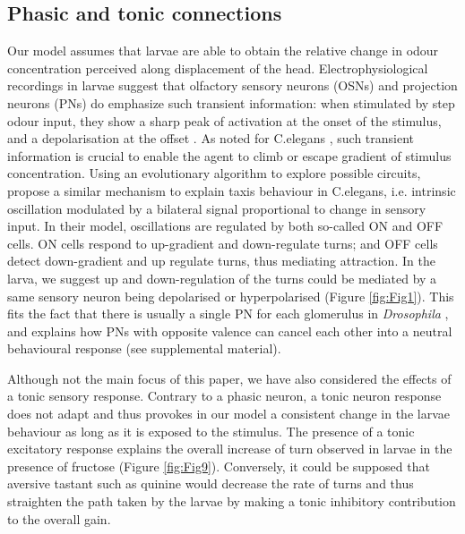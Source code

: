 \documentclass[10pt,a4paper]{article}
\newcommand{\Dros }{\emph{Drosophila }}
\begin{document}
\subsection{Phasic and tonic connections}
Our model assumes that larvae are able to obtain the relative change in odour concentration perceived along displacement of the head.  Electrophysiological recordings in larvae suggest that olfactory sensory neurons (OSNs) and projection neurons (PNs) do emphasize such transient information: when stimulated by step odour input, they show a sharp peak of activation at the onset of the stimulus, and a depolarisation at the offset \cite{schulze2015dynamical}. As noted for C.elegans \citep{lockery2011computational}, such transient information is crucial to enable the agent to climb or escape gradient of stimulus concentration. Using an evolutionary algorithm to explore possible circuits, \cite{izquierdo2010evolution} propose a similar mechanism to explain taxis behaviour in C.elegans, i.e. intrinsic oscillation modulated by a bilateral signal proportional to change in sensory input. In their model, oscillations are regulated by both so-called ON and OFF cells. ON cells respond to up-gradient and down-regulate turns; and OFF cells detect down-gradient and up regulate turns, thus mediating attraction. In the larva, we suggest up and down-regulation of the turns could be mediated by a same sensory neuron being depolarised or hyperpolarised (Figure \ref{fig:Fig1}). This fits the fact that there is usually a single PN for each glomerulus in \Dros {}, and explains how PNs with opposite valence can cancel each other into a neutral behavioural response (see supplemental material). 

Although not the main focus of this paper, we have also considered the effects of a tonic sensory response. Contrary to a phasic neuron, a tonic neuron response does not adapt and thus provokes in our model a consistent change in the larvae behaviour as long as it is exposed to the stimulus. The presence of a tonic excitatory response explains the overall increase of turn observed in larvae in the presence of fructose (Figure \ref{fig:Fig9}). Conversely, it could be supposed that aversive tastant such as quinine would decrease the rate of turns and thus straighten the path taken by the larvae by making a tonic inhibitory contribution to the overall gain. 
\end{document}

